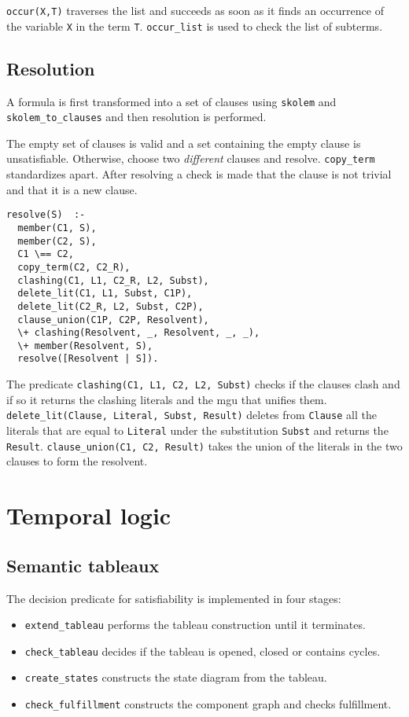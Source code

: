 \documentclass[11pt]{article}
\newcommand*{\p}[1]{\textup{\texttt{#1}}}
\begin{document}
\p{occur(X,T)} traverses the list and succeeds as soon as it finds an
occurrence of the variable \p{X} in the term \p{T}. \p{occur\_list} is
used to check the list of subterms.




\subsection{Resolution}\label{s.resfol}

A formula is first transformed into a set of clauses using \p{skolem}
and \p{skolem\_to\_clauses} and then resolution is performed.

The empty set of clauses is valid and a set containing the empty clause
is unsatisfiable. Otherwise, choose two \emph{different} clauses and
resolve. \p{copy\_term} standardizes apart. After resolving a check is
made that the clause is not trivial and that it is a new clause.
\begin{verbatim}
resolve(S)  :-
  member(C1, S),
  member(C2, S),
  C1 \== C2,
  copy_term(C2, C2_R),
  clashing(C1, L1, C2_R, L2, Subst),
  delete_lit(C1, L1, Subst, C1P),
  delete_lit(C2_R, L2, Subst, C2P),
  clause_union(C1P, C2P, Resolvent),
  \+ clashing(Resolvent, _, Resolvent, _, _),
  \+ member(Resolvent, S),
  resolve([Resolvent | S]).
\end{verbatim}

The predicate \p{clashing(C1, L1, C2, L2, Subst)} checks if the clauses
clash and if so it returns the clashing literals and the mgu that
unifies them. \p{delete\_lit(Clause, Literal, Subst, Result)} deletes
from \p{Clause} all the literals that are equal to \p{Literal} under the
substitution \p{Subst} and returns the \p{Result}. \p{clause\_union(C1,
C2, Result)} takes the union of the literals in the two clauses to form
the resolvent.

\newpage

\section{Temporal logic}

\subsection{Semantic tableaux}\label{s.tabtl}

The decision predicate for
satisfiability is implemented in four stages:
\begin{itemize}
\item \p{extend\_tableau} performs the tableau
construction until it terminates.
\item \p{check\_tableau} decides if the tableau is opened,
closed or contains cycles.
\item \p{create\_states} constructs the state diagram
from the tableau.
\item \p{check\_fulfillment}
constructs the component graph and checks fulfillment.
\end{itemize}
\end{document}
